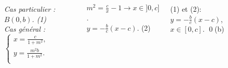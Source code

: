 \documentclass[10pt]{beamer}
\begin{document}
{\begin{columns}[t]
	\centering\noindent\rule{2cm}{0.4pt}\flushleft \bigskip
	
	\textit{Cas particulier : $B (0,b)$. (1)} \\ \bigskip
	\textit{Cas général :       $\begin{cases}x= \frac{c}{1+m^2}, \\
						 y= \frac{m^2b}{1+m^2}.	 \\
				    \end{cases}$}  \\ \medskip 
		   		   
	$m^2=\frac{c}{x}-1  \rightarrow	x\in]0,c]$. \\ \medskip
	$y = -\frac{b}{c}(x-c)$. (2)\\ \bigskip \bigskip
	
	(1) et (2): \\ \medskip
	$y = -\frac{b}{c}(x-c)$, $x\in[0,c]$. \hfill \qed (b)\\ \bigskip
	
	\end{columns}
	
	}
\end{document}
